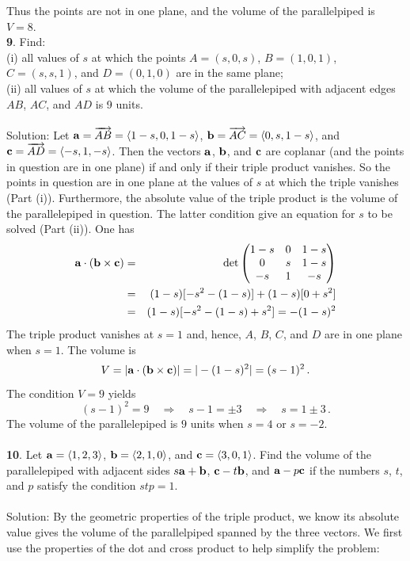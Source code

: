 \documentclass[12pt]{amsbook}
\newcommand{\la}{\langle}
\newcommand{\ra}{\rangle}
\begin{document}
Thus the points are not in one plane, and the volume of the parallelpiped is $V=8$.
\\
{\small\bf 9}. Find:\\ (i) all values of $s$ at which the points $A=(s,
0, s)$, $B=(1, 0, 1)$, $C=(s, s, 1)$, and $D=(0, 1, 0)$ are in the
same plane;\\ (ii) all values of $s$ at which the volume of the
parallelepiped with adjacent edges 
$AB$, $AC$, and $AD$ is 9 units.\\
\\
{\sc Solution}: Let 
${\bf a}=\overrightarrow{AB}=\langle 1-s, 0, 1-s\rangle$,
${\bf b}=\overrightarrow{AC}=\langle 0, s, 1-s\rangle$,
and ${\bf c}=\overrightarrow{AD}=\langle -s,1 , -s\rangle$.
Then the vectors ${\bf a}$, ${\bf b}$, and ${\bf c}$ are 
coplanar (and the points in question are in one plane) 
if and only if their triple product vanishes. So the points
in question are in one plane at 
the values of $s$ at which the triple vanishes (Part (i)). 
Furthermore, the absolute value of the triple product
is the volume of the parallelepiped in question. The latter
condition give an equation for $s$ to be solved (Part (ii)).
One has
\begin{eqnarray*}
{\bf a}\cdot({\bf b}\times{\bf c})&=&\det
\begin{pmatrix}1-s& 0& 1-s\cr
          0& s& 1-s\cr
          -s&1 & -s\end{pmatrix}\\
&=&
(1-s)[-s^2-(1-s)]+(1-s)[0+s^2]\\
&=&(1-s)[-s^2-(1-s)+s^2]=-(1-s)^2
\end{eqnarray*}
The triple product vanishes at $s=1$ and, hence,
$A$, $B$, $C$, and $D$ are in one plane when $s=1$.
The volume is 
$$V=|{\bf a}\cdot({\bf b}\times{\bf c})|=|-(1-s)^2|=(s-1)^2\,.
$$
The condition 
$V=9$ yields 
$$(s-1)^2=9 \quad \Rightarrow\quad s-1=\pm 3\quad\Rightarrow\quad 
s=1\pm 3\,. 
$$
The volume of the parallelepiped is 
$9$ units when $s=4$ or $s=-2$.\\
\\
{\small\bf 10}. Let ${\bf a}=\la 1,2,3\ra$, ${\bf b}=
\la 2,1,0\ra$, and ${\bf c}=\la 3,0,1\ra$.
Find the volume of the parallelepiped with adjacent
sides $s{\bf a}+{\bf b}$, ${\bf c}-t{\bf b}$, 
and ${\bf a}-p{\bf c}$ if the numbers  $s$, $t$, and $p$ satisfy
the condition $stp=1$.\\
\\
{\sc Solution}: By the geometric properties of the triple product, we know its absolute value gives the volume of the parallelpiped spanned by the three vectors. We first use the properties of the dot and cross product to help simplify the problem:
\end{document}
